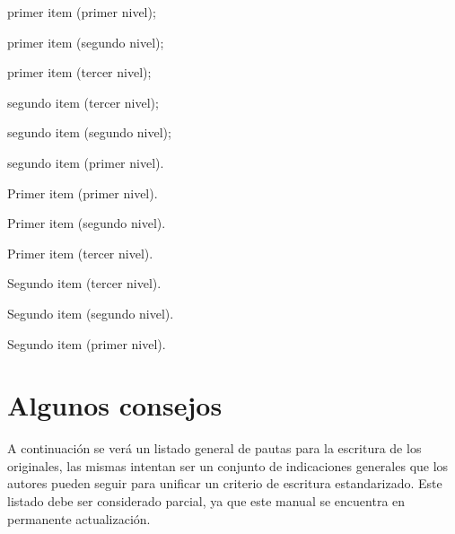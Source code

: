 \documentclass{book}
\begin{document}
{{{{\begin{mdframed}[linewidth=.5pt,linecolor=black!30,roundcorner=3pt]
\begin{compactenum}
\item primer item (primer nivel);
	\begin{compactenum}
	\item primer item (segundo nivel);
		\begin{compactenum}
		\item primer item (tercer nivel);
		\item segundo item (tercer nivel);
		\end{compactenum}
	\item segundo item (segundo nivel);
	\end{compactenum}
\item segundo item (primer nivel).
\end{compactenum}
\end{mdframed}

\begin{mdframed}[linewidth=.5pt,linecolor=black!30,roundcorner=3pt]
\begin{compactitem}
\item Primer item (primer nivel).
	\begin{compactitem}
	\item Primer item (segundo nivel).
		\begin{compactitem}
		\item Primer item (tercer nivel).
		\item Segundo item (tercer nivel).
		\end{compactitem}
	\item Segundo item (segundo nivel).
	\end{compactitem}
\item Segundo item (primer nivel).
\end{compactitem}
\end{mdframed}

\section{Algunos consejos}

A continuación se verá un listado general de pautas para la escritura de los originales, las mismas intentan ser un conjunto de indicaciones generales que los autores pueden seguir para unificar un criterio de escritura estandarizado. Este listado debe ser considerado parcial, ya que este manual se encuentra en permanente actualización.

}}}}
\end{document}
